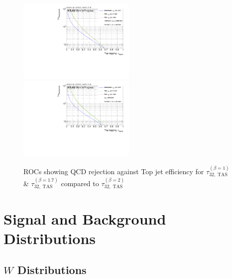 \begin{figure}
\bigskip
\includegraphics[width=0.5\textwidth]{sascha_input/Appendix/Top_best/ROC_ALL_h_recoJet_nSub32_2_bin5.pdf} \hspace{1mm}
\includegraphics[width=0.5\textwidth]{sascha_input/Appendix/Top_best/ROC_ALL_h_recoJet_nSub32_2_bin6.pdf}
\caption{\footnotesize{ROCs showing QCD rejection against Top jet efficiency for $\tau_{32,\;\text{TAS}}^{(\beta=1)}$ \& $\tau_{32,\;\text{TAS}}^{(\beta=1.7)}$ compared to $\tau_{32,\;\text{TAS}}^{(\beta=2)}$}}
\end{figure}

\chapter{Signal and Background Distributions}
\vspace{-0.5cm}
\section{$W$ Distributions}
